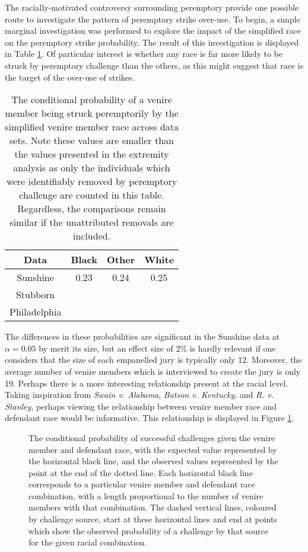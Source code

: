 The racially-motivated controversy surrounding peremptory provide one possible route to investigate the pattern of peremptory
strike over-use. To begin, a simple marginal investigation was performed to explore the impact of the simplified race on the
peremptory strike probability. The result of this investigation is displayed in Table \ref{tab:margrace}. Of particular interest
is whether any race is far more likely to be struck by peremptory challenge than the others, as this might suggest that race is
the target of the over-use of strikes.

\begin{table}
  \centering
  \caption[Strike Rate by Race]{The conditional probability of a venire member being struck peremptorily by the simplified venire
    member race across data sets. Note these values are smaller than the values presented in the extremity analysis as only the
    individuals which were identifiably removed by peremptory challenge are counted in this table. Regardless, the comparisons
    remain similar if the unattributed removals are included.} \label{tab:margrace}
  \begin{tabular}{|c|c|c|c|} \hline
    Data & Black & Other & White \\ \hline
    Sunshine & 0.23 & 0.24 & 0.25 \\ 
    Stubborn &  & & \\ 
    Philadelphia & & & \\ \hline
  \end{tabular}
\end{table}

The differences in these probabilities are significant in the Sunshine data at $\alpha = 0.05$ by merit its size, but an effect
size of 2\% is hardly relevant if one considers that the size of each empanelled jury is typically only 12. Moreover, the average
number of venire members which is interviewed to create the jury is only 19. Perhaps there is a more interesting relationship
present at the racial level. Taking inspiration from \textit{Swain v. Alabama}, \textit{Batson v. Kentucky}, and
\textit{R. v. Stanley}, perhaps viewing the relationship between venire member race and defendant race would be informative. This
relationship is displayed in Figure \ref{fig:racedefmob}.

\begin{figure}[!h]
  \centering
  \caption[The ``Mobile Plot'' of Racial Combination and Strikes]{The conditional probability of successful challenges given the
    venire member and defendant race, with the expected value represented by the horizontal black line, and the observed values
    represented by the point at the end of the dotted line. Each horizontal black line corresponds to a particular venire member
    and defendant race combination, with a length proportional to the number of venire members with that combination. The dashed
    vertical lines, coloured by challenge source, start at these horizontal lines and end at points which show the observed
    probability of a challenge by that source for the given racial combination.}
  \label{fig:racedefmob}
\end{figure}

